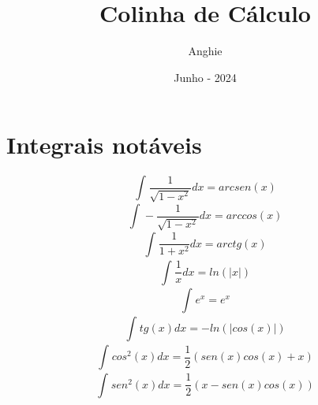 \documentclass{article}
\title{Colinha de Cálculo}
\author{Anghie}
\date{Junho - 2024}
\begin{document}
    \maketitle

    \tableofcontents
    \newpage
    
    \section{Integrais notáveis}
    \begin{equation*}
        \int_{}^{}\frac{1}{\sqrt{1-x^2}}dx = arcsen(x)
    \end{equation*}
    \begin{equation*}
        \int_{}^{}-\frac{1}{\sqrt{1-x^2}}dx = arccos(x)
    \end{equation*}
    \begin{equation*}
        \int_{}^{}\frac{1}{1+x^2}dx = arctg(x)
    \end{equation*}
    \begin{equation*}
        \int_{}^{}\frac{1}{x}dx = ln(|x|)
    \end{equation*}
    \begin{equation*}
        \int_{}^{}e^x = e^x
    \end{equation*}
    \begin{equation*}
        \int_{}^{}tg(x)dx = -ln(|cos(x)|)
    \end{equation*}
    \begin{equation*}
        \int_{}^{}cos^2(x)dx = \frac{1}{2}(sen(x)cos(x)+x)
    \end{equation*}
    \begin{equation*}
        \int_{}^{}sen^2(x)dx = \frac{1}{2}(x - sen(x)cos(x))
    \end{equation*}
\end{document}
